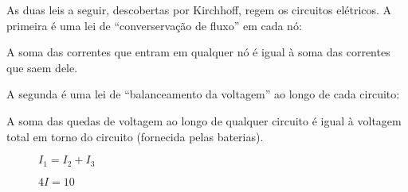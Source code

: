 \documentclass{beamer}
\begin{document}
    \begin{frame}
        As duas leis a seguir, descobertas por Kirchhoff, \pause regem os circuitos elétricos. \pause A primeira é uma lei de ``converservação de fluxo'' em cada nó:\pause

        \vspace{1.5cm}

        \begin{teorema}
            A soma das correntes que entram em qualquer nó \pause é igual à soma das correntes que saem dele.
        \end{teorema}
    \end{frame}

    \begin{frame}
        A segunda é uma lei de ``balanceamento da voltagem'' ao longo de cada circuito:\pause

        \vspace{1.5cm}

        \begin{teorema}
            A soma das quedas de voltagem ao longo de qualquer circuito \pause é igual à voltagem total em torno do circuito (fornecida pelas baterias).
        \end{teorema}
    \end{frame}

    \begin{frame}
        \begin{figure}[!h]
            \centering
            
            \caption{$I_1 = I_2 + I_3$}
        \end{figure}
    \end{frame}

    \begin{frame}
        \begin{figure}[!h]
            \centering
            
            \caption{$4I = 10$}
        \end{figure}
    \end{frame}

    \begin{frame}
        \begin{figure}[!h]
            \centering
            
        \end{figure}
    \end{frame}
\end{document}
